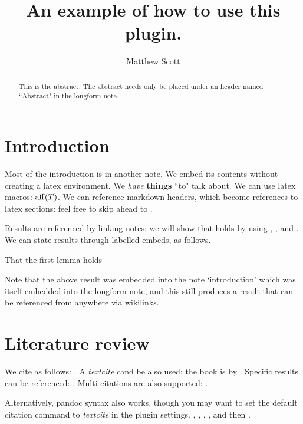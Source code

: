 \documentclass{article}
\title{An example of how to use this plugin.}
\author{Matthew Scott}
\begin{document}
\maketitle
\begin{abstract}
This is the abstract. The abstract needs only be placed under an header named ``Abstract" in the longform note.
\end{abstract}
\section{Introduction}
\label{loc:body.introduction}
Most of the introduction is in another note. We embed its contents without creating a latex environment.
We \emph{have} \textbf{things} ``to" talk about. We can use latex macros: $\operatorname{aff}(T)$. We can reference markdown headers, which become references to latex sections: feel free to skip ahead to .

Results are referenced by linking notes: we will show that  holds by using , ,  and . We can state results through labelled embeds, as follows. 
\begin{lemma}
\label{loc:other_small_lemmas.second_other_lemma}
That the first lemma holds
\end{lemma}
Note that the above result was embedded into the note `introduction' which was itself embedded into the longform note, and this still produces a result that can be referenced from anywhere via wikilinks.
\section{Literature review}
\label{loc:body.literature_review}
We cite as follows: \cite{vershyninHighDimensionalProbabilityIntroduction2018}. A \emph{textcite} cand be also used: the book is by \textcite{vershyninHighDimensionalProbabilityIntroduction2018}. Specific results can be referenced: \cite[Example 5.4]{vershyninHighDimensionalProbabilityIntroduction2018}. Multi-citations are also supported: \cite{berkCoherenceParameterCharacterizing2022, berkModeladaptedFourierSampling2023}.

Alternatively, pandoc syntax also works, though you may want to set the default citation command to \emph{textcite} in the plugin settings. \cite{vershyninHighDimensionalProbabilityIntroduction2018}, \cite{vershyninHighDimensionalProbabilityIntroduction2018}, \cite[Example 2.1]{vershyninHighDimensionalProbabilityIntroduction2018}, \cite{berkCoherenceParameterCharacterizing2022, berkModeladaptedFourierSampling2023}, and then \cite{vershyninHighDimensionalProbabilityIntroduction2018}.
\end{document}
